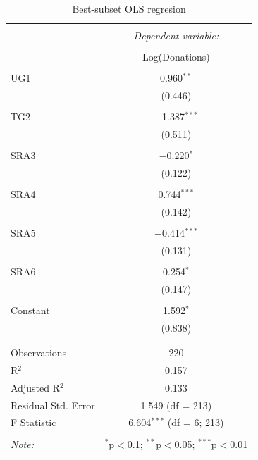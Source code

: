 \documentclass[12pt]{article}
\begin{document}
\begin{table}[!htbp] \centering 
{\color{blue}
  \caption{Best-subset OLS regresion} 
  \label{} 
\begin{tabular}{@{\extracolsep{5pt}}lc} 
\\[-1.8ex]\hline 
\hline \\[-1.8ex] 
 & \multicolumn{1}{c}{\textit{Dependent variable:}} \\ 
\cline{2-2} 
\\[-1.8ex] & Log(Donations) \\ 
\hline \\[-1.8ex] 
 UG1 & 0.960$^{**}$ \\ 
  & (0.446) \\ 
  & \\ 
 TG2 & $-$1.387$^{***}$ \\ 
  & (0.511) \\ 
  & \\ 
 SRA3 & $-$0.220$^{*}$ \\ 
  & (0.122) \\ 
  & \\ 
 SRA4 & 0.744$^{***}$ \\ 
  & (0.142) \\ 
  & \\ 
 SRA5 & $-$0.414$^{***}$ \\ 
  & (0.131) \\ 
  & \\ 
 SRA6 & 0.254$^{*}$ \\ 
  & (0.147) \\ 
  & \\ 
 Constant & 1.592$^{*}$ \\ 
  & (0.838) \\ 
  & \\ 
\hline \\[-1.8ex] 
Observations & 220 \\ 
R$^{2}$ & 0.157 \\ 
Adjusted R$^{2}$ & 0.133 \\ 
Residual Std. Error & 1.549 (df = 213) \\ 
F Statistic & 6.604$^{***}$ (df = 6; 213) \\ 
\hline 
\hline \\[-1.8ex] 
\textit{Note:}  & \multicolumn{1}{r}{$^{*}$p$<$0.1; $^{**}$p$<$0.05; $^{***}$p$<$0.01} \\ 
\end{tabular} 
}
\end{table} 
\end{document}
